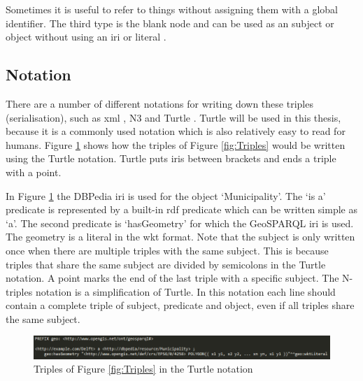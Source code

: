 Sometimes it is useful to refer to things without assigning them with a global identifier. The third type is the blank node and can be used as an subject or object without using an \ac{iri} or literal \citep{LD:W3C6}.  


\subsection{Notation}
There are a number of different notations for writing down these triples (serialisation), such as \ac{xml} \citep{LD:W3C3}, N3 \citep{LD:W3C5} and Turtle \citep{LD:W3C4}. Turtle will be used in this thesis, because it is a commonly used notation which is also relatively easy to read for humans. Figure \ref{fig:Turtle} shows how the triples of Figure \ref{fig:Triples} would be written using the Turtle notation. Turtle puts \acp{iri} between brackets and ends a triple with a point. 

In Figure \ref{fig:Turtle} the DBPedia \ac{iri} is used for the object `Municipality'. The `is a' predicate is represented by a built-in \ac{rdf} predicate which can be written simple as `a'. The second predicate is `hasGeometry' for which the GeoSPARQL \ac{iri} is used. The geometry is a literal in the \ac{wkt} format. Note that the subject is only written once when there are multiple triples with the same subject. This is because triples that share the same subject are divided by semicolons in the Turtle notation. A point marks the end of the last triple with a specific subject. The N-triples notation is a simplification of Turtle. In this notation each line should contain a complete triple of subject, predicate and object, even if all triples share the same subject. 

\begin{figure}
	\centering
	\includegraphics[width=1\linewidth]{figs/Turtle.png}
	\caption{Triples of Figure \ref{fig:Triples} in the Turtle notation}
	\label{fig:Turtle}
\end{figure} 

